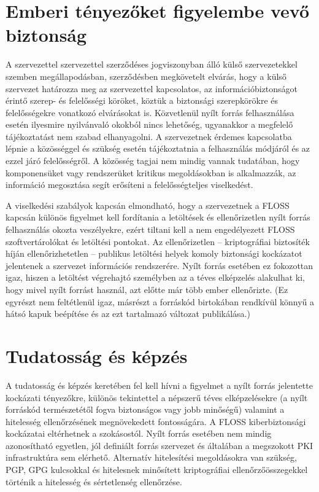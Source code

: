 \documentclass[12pt,magyar,a4paper,oneside]{scrreprt}
\begin{document}
\hypertarget{emberi-tuxe9nyezux151ket-figyelembe-vevux151-biztonsuxe1g}{%
\section{Emberi tényezőket figyelembe vevő
biztonság}\label{emberi-tuxe9nyezux151ket-figyelembe-vevux151-biztonsuxe1g}}

A szervezettel szervezettel szerződéses jogviszonyban álló külső
szervezetekkel szemben megállapodásban, szerződésben megkövetelt
elvárás, hogy a külső szervezet határozza meg az szervezettel
kapcsolatos, az információbiztonságot érintő szerep- és felelősségi
köröket, köztük a biztonsági szerepkörökre és felelősségekre vonatkozó
elvárásokat is. Közvetlenül nyílt forrás felhasználása esetén ilyesmire
nyilvánvaló okokból nincs lehetőség, ugyanakkor a megfelelő
tájékoztatást nem szabad elhanyagolni. A szervezetnek érdemes
kapcsolatba lépnie a közösséggel és szükség esetén tájékoztatnia a
felhasználás módjáról és az ezzel járó felelősségről. A közösség tagjai
nem mindig vannak tudatában, hogy komponensüket vagy rendszerüket
kritikus megoldásokban is alkalmazzák, az információ megosztása segít
erősíteni a felelősségteljes viselkedést.

A viselkedési szabályok kapcsán elmondható, hogy a szervezetnek a FLOSS
kapcsán különös figyelmet kell fordítania a letöltések és ellenőrizetlen
nyílt forrás felhasználás okozta veszélyekre, ezért tiltani kell a nem
engedélyezett FLOSS szoftvertárolókat és letöltési pontokat. Az
ellenőrizetlen -- kriptográfiai biztosíték híján ellenőrizhetetlen --
publikus letöltési helyek komoly biztonsági kockázatot jelentenek a
szervezet információs rendszerére. Nyílt forrás esetében ez fokozottan
igaz, hiszen a letöltést végrehajtó személyben az a téves elképzelés
alakulhat ki, hogy mivel nyílt forrást használ, azt előtte már több
ember ellenőrizte. (Ez egyrészt nem feltétlenül igaz, másrészt a
forráskód birtokában rendkívül könnyű a hátsó kapuk beépítése és az ezt
tartalmazó változat publikálása.)

\hypertarget{tudatossuxe1g-uxe9s-kuxe9pzuxe9s}{%
\section{Tudatosság és képzés}\label{tudatossuxe1g-uxe9s-kuxe9pzuxe9s}}

A tudatosság és képzés keretében fel kell hívni a figyelmet a nyílt
forrás jelentette kockázati tényezőkre, különös tekintettel a népszerű
téves elképzelésekre (a nyílt forráskód természetétől fogva biztonságos
vagy jobb minőségű) valamint a hitelesség ellenőrzésének megnövekedett
fontosságára. A FLOSS kiberbiztonsági kockázatai eltérhetnek a
szokásostól. Nyílt forrás esetében nem mindig azonosítható egyetlen, jól
definiált forrás szervezet és általában a megszokott PKI infrastruktúra
sem elérhető. Alternatív hitelesítési megoldásokra van szükség, PGP, GPG
kulcsokkal és hitelesnek minősített kriptográfiai ellenőrzőösszegekkel
történik a hitelesség és sértetlenség ellenőrzése.
\end{document}
